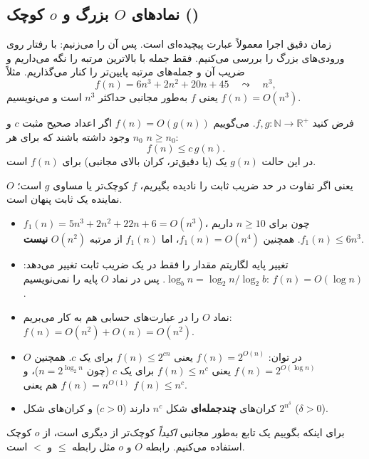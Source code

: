 \subsection{نمادهای $O$ بزرگ و $o$ کوچک ()}

زمان دقیق اجرا معمولاً عبارت پیچیده‌ای است. پس آن را  می‌زنیم: با  رفتار روی ورودی‌های بزرگ را بررسی می‌کنیم. فقط جمله با بالاترین مرتبه را نگه می‌داریم و ضریب آن و جمله‌های مرتبه پایین‌تر را کنار می‌گذاریم. مثلاً
\[f(n)=6n^3+2n^2+20n+45\quad\leadsto\quad n^3,\]
یعنی $f$ به‌طور مجانبی حداکثر $n^3$ است و می‌نویسیم $f(n)=O(n^3)$.

\begin{definition}[$O$ بزرگ]
فرض کنید $f,g:\mathbb{N}\to\mathbb{R}^+$. می‌گوییم $f(n)=O(g(n))$ اگر اعداد صحیح مثبت $c$ و $n_0$ وجود داشته باشند که برای هر $n\ge n_0$:
\[f(n)\le c\,g(n).\]
در این حالت $g(n)$ یک  (یا دقیق‌تر، کران بالای مجانبی) برای $f(n)$ است.
\end{definition}

یعنی اگر تفاوت در حد ضریب ثابت را نادیده بگیریم، $f$ کوچک‌تر یا مساوی $g$ است؛ $O$ نماینده یک ثابت پنهان است.

\begin{example}
\begin{itemize}
\item $f_1(n)=5n^3+2n^2+22n+6=O(n^3)$، چون برای $n\ge10$ داریم $f_1(n)\le6n^3$. همچنین $f_1(n)=O(n^4)$، اما $f_1(n)$ از مرتبه $O(n^2)$ \textbf{نیست}.
\item تغییر پایه لگاریتم مقدار را فقط در یک ضریب ثابت تغییر می‌دهد: $\log_bn=\log_2n/\log_2b$. پس در نماد $O$ پایه را نمی‌نویسیم: $f(n)=O(\log n)$.
\item نماد $O$ را در عبارت‌های حسابی هم به کار می‌بریم: $f(n)=O(n^2)+O(n)=O(n^2)$.
\item $O$ در توان: $f(n)=2^{O(n)}$ یعنی $f(n)\le2^{cn}$ برای یک $c$. همچنین $f(n)=2^{O(\log n)}$ یعنی $f(n)\le n^c$ برای یک $c$ (چون $n=2^{\log_2n}$)، و $f(n)=n^{O(1)}$ هم یعنی $f(n)\le n^c$.
\item کران‌های \textbf{چندجمله‌ای} شکل $n^c$ دارند ($c>0$) و کران‌های  شکل $2^{n^\delta}$ ($\delta>0$).
\end{itemize}
\end{example}

برای اینکه بگوییم یک تابع به‌طور مجانبی \emph{اکیداً} کوچک‌تر از دیگری است، از $o$ کوچک استفاده می‌کنیم. رابطه $O$ و $o$ مثل رابطه $\le$ و $<$ است.

